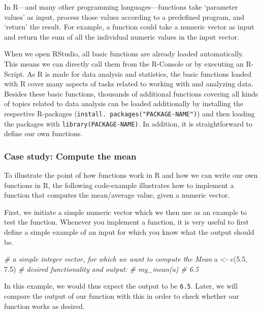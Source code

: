 \documentclass[
  12pt,
]{style/krantz}
\newenvironment{Shaded}{\begin{snugshade}}{\end{snugshade}}
\newcommand{\CommentTok}[1]{\textcolor[rgb]{0.56,0.35,0.01}{\textit{#1}}}
\newcommand{\FloatTok}[1]{\textcolor[rgb]{0.00,0.00,0.81}{#1}}
\newcommand{\FunctionTok}[1]{\textcolor[rgb]{0.00,0.00,0.00}{#1}}
\newcommand{\NormalTok}[1]{#1}
\newcommand{\OtherTok}[1]{\textcolor[rgb]{0.56,0.35,0.01}{#1}}
\begin{document}
In R---and many other programming languages---functions take `parameter values' as input, process those values according to a predefined program, and `return' the result. For example, a function could take a numeric vector as input and return the sum of all the individual numeric values in the input vector.

When we open RStudio, all basic functions are already loaded automatically. This means we can directly call them from the R-Console or by executing an R-Script. As R is made for data analysis and statistics, the basic functions loaded with R cover many aspects of tasks related to working with and analyzing data. Besides these basic functions, thousands of additional functions covering all kinds of topics related to data analysis can be loaded additionally by installing the respective R-packages (\texttt{install.\ packages("PACKAGE-NAME")}) and then loading the packages with \texttt{library(PACKAGE-NAME)}. In addition, it is straightforward to define our own functions.

\hypertarget{case-study-compute-the-mean}{%
\subsubsection{Case study: Compute the mean}\label{case-study-compute-the-mean}}

To illustrate the point of how functions work in R and how we can write our own functions in R, the following code-example illustrates how to implement a function that computes the mean/average value, given a numeric vector.

First, we initiate a simple numeric vector which we then use as an example to test the function. Whenever you implement a function, it is very useful to first define a simple example of an input for which you know what the output should be.

\begin{Shaded}
\begin{Highlighting}[]
\CommentTok{\# a simple integer vector, for which we want to compute the Mean}
\NormalTok{a }\OtherTok{\textless{}{-}} \FunctionTok{c}\NormalTok{(}\FloatTok{5.5}\NormalTok{, }\FloatTok{7.5}\NormalTok{)}
\CommentTok{\# desired functionality and output:}
\CommentTok{\# my\_mean(a)}
\CommentTok{\# 6.5}
\end{Highlighting}
\end{Shaded}

In this example, we would thus expect the output to be \texttt{6.5}. Later, we will compare the output of our function with this in order to check whether our function works as desired.
\end{document}
